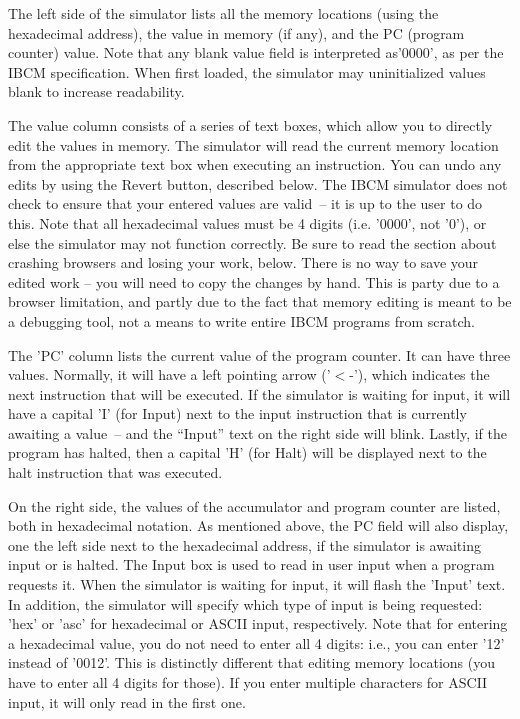 The left side of the simulator lists all the memory locations (using
the hexadecimal address), the value in memory (if any), and the PC
(program counter) value. Note that any blank value field is
interpreted as'0000', as per the IBCM specification. When first
loaded, the simulator may uninitialized values blank to increase
readability.

The value column consists of a series of text boxes, which allow you
to directly edit the values in memory. The simulator will read the
current memory location from the appropriate text box when executing an
instruction. You can undo any edits by using the Revert button,
described below. The IBCM simulator does not check to ensure that your
entered values are valid~-- it is up to the user to do this. Note that
all hexadecimal values must be 4 digits (i.e. '0000', not '0'), or
else the simulator may not function correctly. Be sure to read the
section about crashing browsers and losing your work, below. There is
no way to save your edited work -- you will need to copy the changes
by hand. This is party due to a browser limitation, and partly due to
the fact that memory editing is meant to be a debugging tool, not a
means to write entire IBCM programs from scratch.

The 'PC' column lists the current value of the program counter. It can
have three values. Normally, it will have a left pointing arrow
('$<$-'), which indicates the next instruction that will be executed.
If the simulator is waiting for input, it will have a capital 'I' (for
Input) next to the input instruction that is currently awaiting a
value~-- and the ``Input'' text on the right side will blink. Lastly,
if the program has halted, then a capital 'H' (for Halt) will be
displayed next to the halt instruction that was executed.

On the right side, the values of the accumulator and program counter
are listed, both in hexadecimal notation. As mentioned above, the PC
field will also display, one the left side next to the hexadecimal
address, if the simulator is awaiting input or is halted. The Input
box is used to read in user input when a program requests it. When the
simulator is waiting for input, it will flash the 'Input' text. In
addition, the simulator will specify which type of input is being
requested: 'hex' or 'asc' for hexadecimal or ASCII input,
respectively. Note that for entering a hexadecimal value, you do not
need to enter all 4 digits: i.e., you can enter '12' instead of
'0012'. This is distinctly different that editing memory locations
(you have to enter all 4 digits for those). If you enter multiple
characters for ASCII input, it will only read in the first one.

